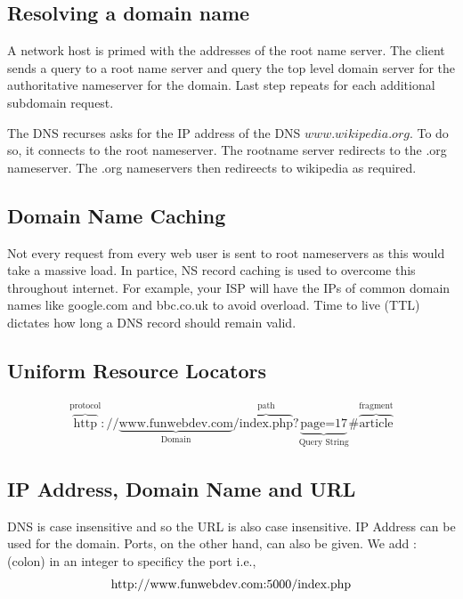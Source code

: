 \documentclass[a4paper]{article}
\theoremstyle{plain}
\theoremstyle{definition}
\newtheorem{exmp}{Example}[section]
\theoremstyle{remark}
\begin{document}
\begin{flushleft}
\subsection{Resolving a domain name}
A network host is primed with the addresses of the root name server. The client sends a query to a root name server and query the top level domain server for the authoritative nameserver for the domain. Last step repeats for each additional subdomain request. 
\begin{tcolorbox}[colback=black!3!white,colframe=black!60!white,title=\begin{exmp}Wikipedia \label{Wikipedia}\end{exmp}]
        The DNS recurses asks for the IP address of the DNS $www.wikipedia.org$. To do so, it connects to the root nameserver. The rootname server redirects to the .org nameserver. The .org nameservers then redireects to wikipedia as required.
\end{tcolorbox}
\subsection{Domain Name Caching}
Not every request from every web user is sent to root nameservers as this would take a massive load. In partice, NS record caching is used to overcome this throughout internet. For example, your ISP will have the IPs of common domain names like google.com and bbc.co.uk to avoid overload. Time to live (TTL) dictates how long a DNS record should remain valid.
\subsection{Uniform Resource Locators}
\begin{align}
	\overbrace{\text{http}}^{\text{protocol}}:\slash\slash\underbrace{\text{www.funwebdev.com}}_{\text{Domain}}\slash\overbrace{\text{index.php}}^{\text{path}}?\underbrace{\text{page=17}}_{\text{Query String}}\# \overbrace{\text{article}}^{\text{fragment}}
\end{align}
\subsection{IP Address, Domain Name and URL}
DNS is case insensitive and so the URL is also case insensitive. IP Address can be used for the domain. Ports, on the other hand, can also be given. We add : (colon) in an integer to specificy the port i.e., \\
\begin{align*}
	\text{http:\slash\slash www.funwebdev.com:5000\slash index.php}
\end{align*}

\end{flushleft}
\end{document}
